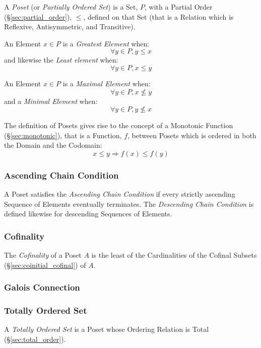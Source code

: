 A \emph{Poset} (or \emph{Partially Ordered Set}) is a Set, $P$, with a
Partial Order (\S\ref{sec:partial_order}), $\leq$, defined on that
Set (that is a Relation which is Reflexive, Antisymmetric, and
Transitive).

An Element $x \in P$ is a \emph{Greatest Element} when:
\[
  \forall y \in P, y \leq x
\]
and likewise the \emph{Least element} when:
\[
  \forall y \in P, x \leq y
\]

An Element $x \in P$ is a \emph{Maximal Element} when:
\[
  \forall y \in P, x \nleq y
\]
and a \emph{Minimal Element} when:
\[
  \forall y \in P, y \nleq x
\]

The definition of Posets gives rise to the concept of a Monotonic
Function (\S\ref{sec:monotonic}), that is a Function, $f$, between
Posets which is ordered in both the Domain and the Codomain:
\[
  x \leq y \Rightarrow f(x) \leq f(y)
\]



\subsubsection{Ascending Chain Condition}\label{sec:ascending_chain}

A Poset satisfies the \emph{Ascending Chain Condition} if every
strictly ascending Sequence of Elements eventually terminates. The
\emph{Descending Chain Condition} is defined likewise for descending
Sequences of Elements.



\subsubsection{Cofinality}\label{sec:cofinality}

The \emph{Cofinality} of a Poset $A$ is the least of the Cardinalities
of the Cofinal Subsets (\S\ref{sec:coinitial_cofinal}) of $A$.



\subsubsection{Galois Connection}\label{sec:galois_connection}



\subsubsection{Totally Ordered Set}\label{sec:totally_ordered}

A \emph{Totally Ordered Set} is a Poset whose Ordering Relation is
Total (\S\ref{sec:total_order}).



